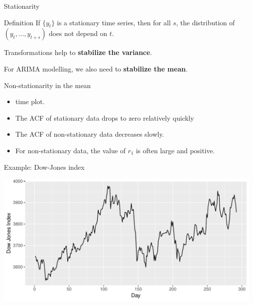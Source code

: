 \documentclass[14pt,ignorenonframetext,]{beamer}
\begin{document}
\begin{frame}{Stationarity}

\begin{block}{Definition}
If $\{y_t\}$ is a stationary time series, then for all $s$, the distribution of $(y_t,\dots,y_{t+s})$ does not depend on $t$.
\end{block}

\pause\vspace*{0.4cm}

Transformations help to \textbf{stabilize the variance}.

For ARIMA modelling, we also need to \textbf{stabilize the mean}.

\end{frame}

\begin{frame}{Non-stationarity in the mean}


\begin{itemize}
\item
  time plot.
\item
  The ACF of stationary data drops to zero relatively quickly
\item
  The ACF of non-stationary data decreases slowly.
\item
  For non-stationary data, the value of \(r_1\) is often large and
  positive.
\end{itemize}

\end{frame}

\begin{frame}{Example: Dow-Jones index}

\includegraphics{week_5_arima_files/figure-beamer/unnamed-chunk-9-1.pdf}

\end{frame}
\end{document}
